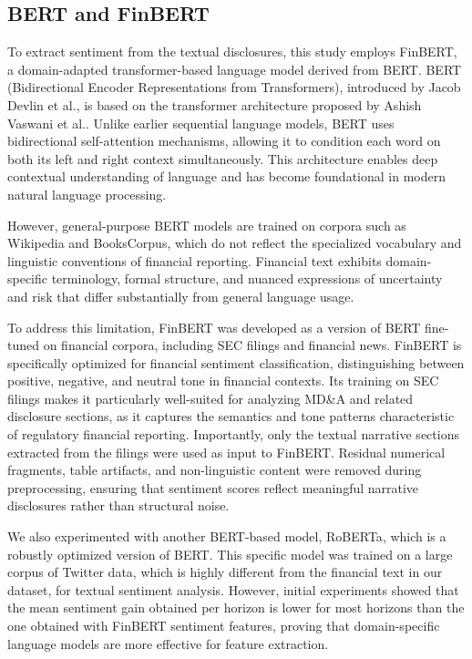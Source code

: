 \subsection*{BERT and FinBERT}

To extract sentiment from the textual disclosures, this study employs FinBERT\cite{yang2020finbert}, a domain-adapted transformer-based language model derived from BERT.
BERT (Bidirectional Encoder Representations from Transformers), introduced by Jacob Devlin et al.\cite{devlin2019bertpretrainingdeepbidirectional}, is based on the transformer architecture proposed by Ashish Vaswani et al.\cite{vaswani2017attention}. 
Unlike earlier sequential language models, BERT uses bidirectional self-attention mechanisms, allowing it to condition each word on both its left and right context simultaneously. 
This architecture enables deep contextual understanding of language and has become foundational in modern natural language processing.

However, general-purpose BERT models are trained on corpora such as Wikipedia and BooksCorpus, which do not reflect the specialized vocabulary and linguistic conventions of financial reporting. 
Financial text exhibits domain-specific terminology, formal structure, and nuanced expressions of uncertainty and risk that differ substantially from general language usage.

To address this limitation, FinBERT was developed as a version of BERT fine-tuned on financial corpora, including SEC filings and financial news. 
FinBERT is specifically optimized for financial sentiment classification, distinguishing between positive, negative, and neutral tone in financial contexts. 
Its training on SEC filings makes it particularly well-suited for analyzing MD\&A and related disclosure sections, as it captures the semantics and tone patterns characteristic of regulatory financial reporting.
Importantly, only the textual narrative sections extracted from the filings were used as input to FinBERT. 
Residual numerical fragments, table artifacts, and non-linguistic content were removed during preprocessing, ensuring that sentiment scores reflect meaningful narrative disclosures rather than structural noise.

We also experimented with another BERT-based model, RoBERTa\cite{roberta}, which is a robustly optimized version of BERT. This specific model was trained on a large corpus of Twitter data, which is highly different from the financial text in our dataset,
for textual sentiment analysis\cite{roberta-twitter}. However, initial experiments showed that the mean sentiment gain obtained per horizon is lower for most horizons than the one obtained with FinBERT sentiment features, proving that 
domain-specific language models are more effective for feature extraction.

